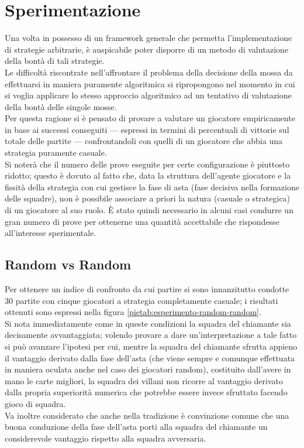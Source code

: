 \chapter*{Sperimentazione}
\graphicspath{{Chapter6/Chapter6Figs/PNG/}{Chapter6/Chapter6Figs/PDF/}{Chapter6/Chapter6Figs/}}

Una volta in possesso di un framework generale che permetta l'implementazione di strategie arbitrarie, è auspicabile poter disporre di un metodo di valutazione della bontà di tali strategie.\\
Le difficoltà riscontrate nell'affrontare il problema della decisione della mossa da effettuarsi in maniera puramente algoritmica si ripropongono nel momento in cui si voglia applicare lo stesso approccio algoritmico ad un tentativo di valutazione della bontà delle singole mosse.\\
Per questa ragione si è pensato di provare a valutare un giocatore empiricamente in base ai successi conseguiti --- espressi in termini di percentuali di vittorie sul totale delle partite ---  confrontandoli con quelli di un giocatore che abbia una strategia puramente casuale.\\
Si noterà che il numero delle prove eseguite per certe configurazione è piuttosto ridotto; questo è dovuto al fatto che, data la struttura dell'agente giocatore e la fissità della strategia con cui gestisce la fase di asta (fase decisiva nella formazione delle squadre), non è possibile associare a priori la natura (casuale o strategica) di un giocatore al suo ruolo. È stato quindi necessario in alcuni casi condurre un gran numero di prove per ottenerne una quantità accettabile che rispondesse all'interesse sperimentale.


\section{Random vs Random}

Per ottenere un indice di confronto da cui partire si sono innanzitutto condotte 30 partite con cinque giocatori a strategia completamente casuale; i risultati ottenuti sono espressi nella figura \ref{pietab:esperimento-random-random}.\\
Si nota immediatamente come in queste condizioni la squadra del chiamante sia decisamente avvantaggiata; volendo provare a dare un'interpretazione a tale fatto si può avanzare l'ipotesi per cui, mentre la squadra del chiamante sfrutta appieno il vantaggio derivato dalla fase dell'asta (che viene sempre e comunque effettuata in maniera oculata anche nel caso dei giocatori random), costituito dall'avere in mano le carte migliori, la squadra dei villani non ricorre al vantaggio derivato dalla propria superiorità numerica che potrebbe essere invece sfruttato facendo gioco di squadra.\\
Va inoltre considerato che anche nella tradizione è convinzione comune che una buona conduzione della fase dell'asta porti alla squadra del chiamante un considerevole vantaggio rispetto alla squadra avversaria.

